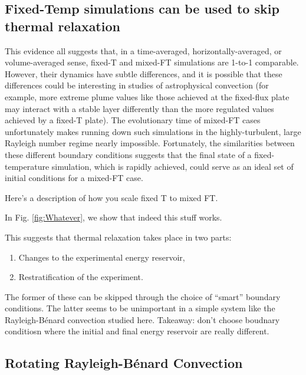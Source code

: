 \documentclass[aps, pre, onecolumn, nofootinbib, notitlepage, groupedaddress, amsfonts, amssymb, amsmath, longbibliography]{revtex4-1}
\newcommand{\RB}{Rayleigh-B\'{e}nard }
\begin{document}
\subsection{Fixed-Temp simulations can be used to skip thermal relaxation}

This evidence all suggests that, in a time-averaged, horizontally-averaged, or volume-averaged sense, fixed-T and mixed-FT simulations are 1-to-1 comparable.
However, their dynamics have subtle differences, and it is possible that these differences could be interesting in studies of astrophysical convection (for example, more extreme plume values like those achieved at the fixed-flux plate may interact with a stable layer differently than the more regulated values achieved by a fixed-T plate).
The evolutionary time of mixed-FT cases unfortunately makes running down such simulations in the highly-turbulent, large Rayleigh number regime nearly impossible.
Fortunately, the similarities between these different boundary conditions suggests that the final state of a fixed-temperature simulation, which is rapidly achieved, could serve as an ideal set of initial conditions for a mixed-FT case.

Here's a description of how you scale fixed T  to mixed FT.

In Fig. \ref{fig:Whatever}, we show that indeed this stuff works.

This suggests that thermal relaxation takes place in two parts:
\begin{enumerate}
\item Changes to the experimental energy reservoir,
\item Restratification of the experiment.
\end{enumerate}
The former of these can be skipped through the choice of ``smart'' boundary conditions.
The latter seems to be unimportant in a simple system like the \RB convection studied here.
Takeaway: don't choose boudnary conditiosn where the initial and final energy reservoir are really different.



\subsection{Rotating \RB Convection}
\label{sec:rotating_results}


\end{document}
